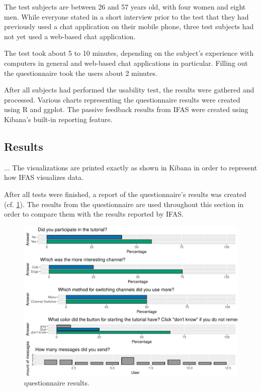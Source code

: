 The test subjects are between 26 and 57 years old, with four women and eight men.
While everyone stated in a short interview prior to the test that they had previously used a chat application on their mobile phone, three test subjects had not yet used a web-based chat application.

The test took about 5 to 10 minutes, depending on the subject's experience with computers in general and web-based chat applications in particular.
Filling out the questionnaire took the users about 2 minutes.

After all subjects had performed the usability test, the results were gathered and processed.
Various charts representing the questionnaire results were created using R and ggplot.
The passive feedback results from \ac{IFAS} were created using Kibana's built-in reporting feature.

\subsection{Results}

...
The visualizations are printed exactly as shown in Kibana in order to represent how \ac{IFAS} visualizes data.

After all tests were finished, a report of the questionnaire's results was created (cf. \cref{figure:evaluation:user:survey-report}).
The results from the questionnaire are used throughout this section in order to compare them with the results reported by \ac{IFAS}.

\begin{figure}[h]
        \includegraphics[width=.75\paperwidth]{gfx/survey.pdf}
        \caption{questionnaire results.}
        \label{figure:evaluation:user:survey-report}
\end{figure}


